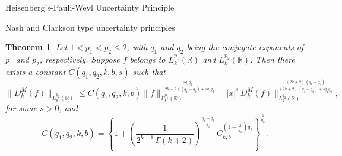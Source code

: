 \documentclass[12pt,a4paper,reqno]{amsproc}
\newtheorem{theorem}{Theorem}[section]
\theoremstyle{definition}
\theoremstyle{remark}
\numberwithin{equation}{section}
\begin{document}
\begin{subsection}{Heisenberg's-Pauli-Weyl Uncertainty Principle}
\begin{subsection}{Nash and Clarkson type uncertainty principles}
\begin{theorem} \label{t:4.8}
Let $1<p_1<p_2\le2$, with $q_1$ and $q_2$ being the conjugate exponents of $p_1$ and $p_2$, respectively. Suppose $f$ belongs to $ L_k^{p_1}(\mathbb{R})$ and $ L_k^{p_2}(\mathbb{R})$. Then there exists a constant $C(q_1,q_2,k,b,s)$ such that
\begin{equation*}
    \|D_k^M(f)\|_{L_k^{q_2}(\mathbb{R})} \le C(q_1,q_2,k,b) \|f\|^{\frac{sq_1q_2}{(2k+2)\,(q_1-q_2)+sq_1q_2}}_{L_k^{p_1}(\mathbb{R})}\||x|^s\, D_k^M(f)\|_{L_k^{q_2}(\mathbb{R})}^{\frac{(2k+2)\,(q_1-q_2)}{(2k+2)\,(q_1-q_2)+sq_1q_2}},
\end{equation*}
for some $s>0$, and
\begin{equation*}
 C(q_1,q_2,k,b) = \left\{ 1+\left(\frac{1}{2^{k+1}\,\Gamma(k+2) }\right)^{\frac{q_1-q_2}{q_1}}\, C_{k,b}^{(1-\frac{2}{q_1})q_2}\right\} ^{\frac{1}{q_{2}}}.  
\end{equation*}


\end{theorem}
\end{subsection}
\end{subsection}
\end{document}
